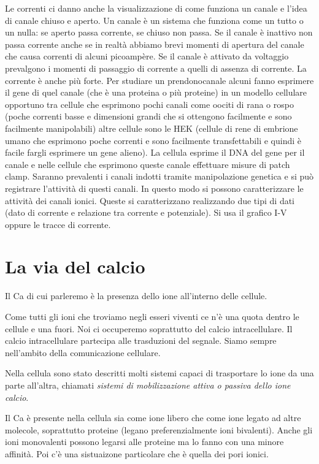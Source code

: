 \documentclass[]{article}
\begin{document}
Le correnti ci danno anche la visualizzazione di come funziona un canale
e l'idea di canale chiuso e aperto. Un canale è un sistema che funziona
come un tutto o un nulla: se aperto passa corrente, se chiuso non passa.
Se il canale è inattivo non passa corrente anche se in realtà abbiamo
brevi momenti di apertura del canale che causa correnti di alcuni
picoampère. Se il canale è attivato da voltaggio prevalgono i momenti di
passaggio di corrente a quelli di assenza di corrente. La corrente è
anche più forte. Per studiare un prendonocanale alcuni fanno esprimere
il gene di quel canale (che è una proteina o più proteine) in un modello
cellulare opportuno tra cellule che esprimono pochi canali come oociti
di rana o rospo (poche correnti basse e dimensioni grandi che si
ottengono facilmente e sono facilmente manipolabili) altre cellule sono
le HEK (cellule di rene di embrione umano che esprimono poche correnti e
sono facilmente transfettabili e quindi è facile fargli esprimere un
gene alieno). La cellula esprime il DNA del gene per il canale e nelle
cellule che esprimono queste canale effettuare misure di patch clamp.
Saranno prevalenti i canali indotti tramite manipolazione genetica e si
può registrare l'attività di questi canali. In questo modo si possono
caratterizzare le attività dei canali ionici. Queste si caratterizzano
realizzando due tipi di dati (dato di corrente e relazione tra corrente
e potenziale). Si usa il grafico I-V oppure le tracce di corrente.

\section{La via del calcio}\label{la-via-del-calcio}

Il Ca di cui parleremo è la presenza dello ione all'interno delle
cellule.

Come tutti gli ioni che troviamo negli esseri viventi ce n'è una quota
dentro le cellule e una fuori. Noi ci occuperemo soprattutto del calcio
intracellulare. Il calcio intracellulare partecipa alle trasduzioni del
segnale. Siamo sempre nell'ambito della comunicazione cellulare.

Nella cellula sono stato descritti molti sistemi capaci di trasportare
lo ione da una parte all'altra, chiamati \emph{sistemi di mobilizzazione
attiva o passiva dello ione calcio}.

Il Ca è presente nella cellula sia come ione libero che come ione legato
ad altre molecole, soprattutto proteine (legano preferenzialmente ioni
bivalenti). Anche gli ioni monovalenti possono legarsi alle proteine ma
lo fanno con una minore affinità. Poi c'è una sistuaizone particolare
che è quella dei pori ionici.
\end{document}
